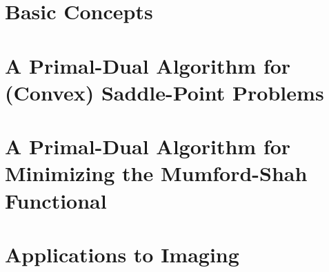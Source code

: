 \documentclass{scrreprt}
\begin{document}





\chapter{Basic Concepts} %
\label{cha:basic_concepts}

    
    
    


\chapter{A Primal-Dual Algorithm for (Convex) Saddle-Point Problems} %
\label{cha:a_first_order_primal_dual_algorithm_for_convex_saddle_point_problems}
    
    
    
    
    
    
    


\chapter{A Primal-Dual Algorithm for Minimizing the Mumford-Shah Functional} %
\label{cha:a_first_order_primal_dual_algorithm_for_minimizing_the_mumford_shah_functional}
    
    
    
    
    
    


\chapter{Applications to Imaging} %
\label{cha:applications_to_imaging}
\end{document}

